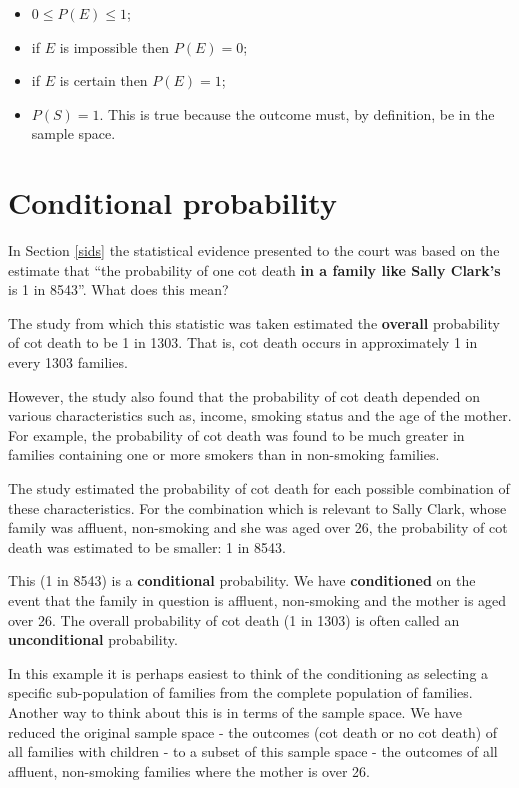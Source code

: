 \documentclass[
  11pt,
  british,
  openany, a4paper]{book}
\providecommand{\tightlist}{%
  \setlength{\itemsep}{0pt}\setlength{\parskip}{0pt}}
\begin{document}
\begin{itemize}
\tightlist
\item
  \(0 \leq P(E) \leq 1\);
\item
  if \(E\) is impossible then \(P(E)=0\);
\item
  if \(E\) is certain then \(P(E)=1\);
\item
  \(P(S)=1\). This is true because the outcome must, by definition, be in the sample space.
\end{itemize}

\hypertarget{conditional-probability}{%
\section{Conditional probability}\label{conditional-probability}}

In Section \ref{sids} the statistical evidence presented to the court was based on the estimate that ``the probability of one cot death \textbf{in a family like Sally Clark's} is 1 in 8543''. What does this mean?

The study from which this statistic was taken estimated the \textbf{overall} probability of cot death to be 1 in 1303. That is, cot death occurs in approximately 1 in every 1303 families.

However, the study also found that the probability of cot death depended on various characteristics such as, income, smoking status and the age of the mother. For example, the probability of cot death was found to be much greater in families containing one or more smokers than in non-smoking families.

The study estimated the probability of cot death for each possible combination of these characteristics. For the combination which is relevant to Sally Clark, whose family was affluent, non-smoking and she was aged over 26, the probability of cot death was estimated to be smaller: 1 in 8543.

This (1 in 8543) is a \textbf{conditional} probability. We have \textbf{conditioned} on the event that the family in question is affluent, non-smoking and the mother is aged over 26. The overall probability of cot death (1 in 1303) is often called an \textbf{unconditional} probability.

In this example it is perhaps easiest to think of the conditioning as selecting a specific sub-population of families from the complete population of families. Another way to think about this is in terms of the sample space. We have reduced the original sample space - the outcomes (cot death or no cot death) of all families with children - to a subset of this sample space - the outcomes of all affluent, non-smoking families where the mother is over 26.
\end{document}
